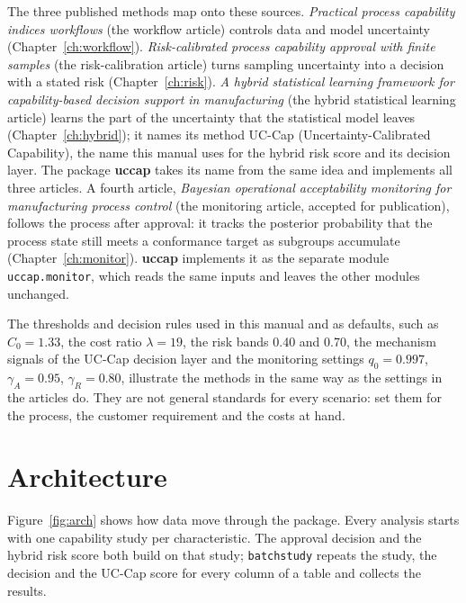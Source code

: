 \documentclass[a4paper,11pt,oneside,openany,parskip=half-,headings=standardclasses,toc=flat,numbers=noenddot]{scrbook}
\newcommand{\code}[1]{\texttt{\begingroup\def\_{\textunderscore\allowbreak}#1\endgroup}}
\newcommand{\pkg}{\textsf{\bfseries uccap}}
\newcommand{\chapref}[1]{Chapter~\ref{#1}}
\newcommand{\figref}[1]{Figure~\ref{#1}}
\begin{document}
The three published methods map onto these sources. \emph{Practical process capability indices workflows}
\cite{jy-workflow} (the workflow article) controls data and model uncertainty (\chapref{ch:workflow}).
\emph{Risk-calibrated process capability approval with finite samples} \cite{jy-risk} (the risk-calibration
article) turns sampling uncertainty into a decision with a stated risk (\chapref{ch:risk}). \emph{A hybrid
statistical learning framework for capability-based decision support in manufacturing} \cite{jy-hybrid} (the
hybrid statistical learning article) learns the part of the uncertainty that the statistical model leaves
(\chapref{ch:hybrid}); it names its method UC-Cap (Uncertainty-Calibrated Capability), the name this manual uses
for the hybrid risk score and its decision layer. The package \pkg{} takes its name from the same idea and
implements all three articles. A fourth article, \emph{Bayesian operational acceptability monitoring for
manufacturing process control} \cite{jy-monitor} (the monitoring article, accepted for publication), follows the
process after approval: it tracks the posterior probability that the process state still meets a conformance target
as subgroups accumulate (\chapref{ch:monitor}). \pkg{} implements it as the separate module \code{uccap.monitor},
which reads the same inputs and leaves the other modules unchanged.

The thresholds and decision rules used in this manual and as defaults, such as $C_0 = 1.33$, the cost ratio
$\lambda = 19$, the risk bands 0.40 and 0.70, the mechanism signals of the UC-Cap decision layer and the monitoring
settings $q_0 = 0.997$, $\gamma_A = 0.95$, $\gamma_R = 0.80$, illustrate the methods in the same way as the settings in the articles do. They are not general standards for every scenario: set
them for the process, the customer requirement and the costs at hand.

\section{Architecture}

\figref{fig:arch} shows how data move through the package. Every analysis starts with one
capability study per characteristic. The approval decision and the hybrid risk score both build on
that study; \code{batch\_study} repeats the study, the decision and the UC-Cap score for every column of a
table and collects the results.
\end{document}
